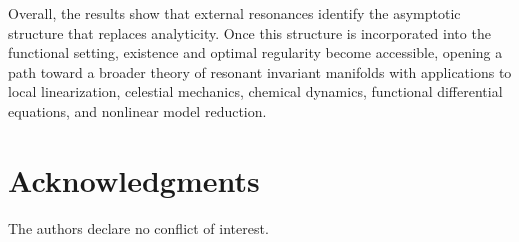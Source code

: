 \documentclass{amsart}
\theoremstyle{plain}
\theoremstyle{definition}
\begin{document}
Overall, the results show that external resonances identify the asymptotic structure that replaces analyticity.  Once this structure is incorporated into the functional setting, existence and optimal regularity become accessible, opening a path toward a broader theory of resonant invariant manifolds with applications to local linearization, celestial mechanics, chemical dynamics, functional differential equations, and nonlinear model reduction.\\

\section{Acknowledgments}
The authors declare no conflict of interest. 










\appendix
\end{document}
